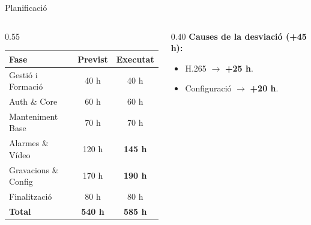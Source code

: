 
\begin{frame}{Planificació}
  \begin{columns}[T]
    \begin{column}{0.55\textwidth}
      \renewcommand{\arraystretch}{1.3}
      \begin{tabular}{lcc}
        \toprule
        \textbf{Fase} & \textbf{Previst} & \textbf{Executat} \\
        \midrule
        Gestió i Formació & 40 h & 40 h \\
        Auth \& Core & 60 h & 60 h \\
        Manteniment Base & 70 h & 70 h \\
        Alarmes \& Vídeo & 120 h & \textbf{145 h} \\
        Gravacions \& Config & 170 h & \textbf{190 h} \\
        Finalització & 80 h & 80 h \\
        \midrule
        \textbf{Total} & \textbf{540 h} & \textbf{585 h} \\
        \bottomrule
      \end{tabular}
    \end{column}

    \begin{column}{0.40\textwidth}
      \textbf{Causes de la desviació (+45 h):}
      \begin{itemize}
        \item H.265 $\to$ \textbf{+25 h}.
        \item Configuració $\to$ \textbf{+20 h}.
      \end{itemize}

    \end{column}
  \end{columns}
\end{frame}

